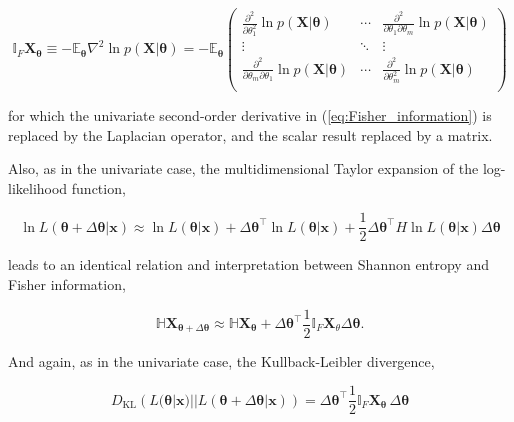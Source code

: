 \documentclass[12pt, twoside, draft]{article}
\begin{document}
\begin{equation}
\mathbb{I}_F \mathbf{X}_{\boldsymbol{\theta}} \equiv -\mathbb{E}_{\boldsymbol{\theta}} \nabla^2 \ln p(\mathbf{X} | \boldsymbol{\theta}) = 
-\mathbb{E}_{\boldsymbol{\theta}}
\begin{pmatrix} 
\frac{\partial^2}{\partial \theta_1^2} \ln p(\mathbf{X} | \boldsymbol{\theta}) & \cdots & \frac{\partial^2 }{\partial \theta_1 \partial \theta_m} \ln p(\mathbf{X} | \boldsymbol{\theta}) \\
\vdots & \ddots & \vdots \\
 \frac{\partial^2 }{\partial \theta_m \partial \theta_1} \ln p(\mathbf{X} | \boldsymbol{\theta}) & \cdots & \frac{\partial^2}{\partial \theta_m^2} \ln p(\mathbf{X} | \boldsymbol{\theta}) \\
\end{pmatrix}
\end{equation}

for which the univariate second-order derivative in (\ref{eq:Fisher_information}) is replaced by the Laplacian operator, and the scalar result replaced by a matrix.

Also, as in the univariate case, the multidimensional Taylor expansion of the log-likelihood function,

\begin{equation}
\ln L(\boldsymbol{\theta} + \Delta \boldsymbol{\theta} | \mathbf{x}) \approx \ln L(\boldsymbol{\theta} | \mathbf{x}) + \Delta \boldsymbol{\theta}^\top \ln L(\boldsymbol{\theta} | \mathbf{x}) + \frac{1}{2} \Delta \boldsymbol{\theta}^\top H \ln L(\boldsymbol{\theta} | \mathbf{x}) \Delta \boldsymbol{\theta}
\end{equation}

leads to an identical relation and interpretation between Shannon entropy and Fisher information,

\begin{equation}
\mathbb{H} \mathbf{X}_{\boldsymbol{\theta} + \Delta \boldsymbol{\theta}} \approx \mathbb{H} \mathbf{X}_{\boldsymbol{\theta}} + \Delta \boldsymbol{\theta}^\top \frac{1}{2} \mathbb{I}_F \mathbf{X}_\theta \Delta \boldsymbol{\theta}.
\end{equation}

And again, as in the univariate case, the Kullback-Leibler divergence,

\begin{equation}
D_{\text{KL}} \left( L(\boldsymbol{\theta} | \mathbf{x}) || L(\boldsymbol{\theta} + \Delta \boldsymbol{\theta} | \mathbf{x}) \right) =  \Delta \boldsymbol{\theta}^\top \frac{1}{2} \mathbb{I}_F \mathbf{X}_{\boldsymbol{\theta}}\, \Delta \boldsymbol{\theta}
\end{equation}
\end{document}
